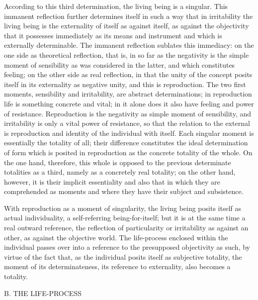 According to this third determination,
the living being is a singular.
This immanent reflection further
 determines itself in such a way
that in irritability the living being is
the externality of itself as against itself,
as against the objectivity
that it possesses immediately
as its means and instrument
and which is externally determinable.
The immanent reflection sublates this immediacy:
on the one side as theoretical reflection,
that is, in so far as the negativity is
the simple moment of sensibility
as was considered in the latter,
and which constitutes feeling;
on the other side as real reflection,
in that the unity of the concept posits itself
in its externality as negative unity,
and this is reproduction.
The two first moments, sensibility and irritability,
are abstract determinations;
in reproduction life is something concrete and vital;
in it alone does it also have feeling and power of resistance.
Reproduction is the negativity as simple moment of sensibility,
and irritability is only a vital power of resistance,
so that the relation to the external is
reproduction and identity of the individual with itself.
Each singular moment is essentially the totality of all;
their difference constitutes the ideal determination of form
which is posited in reproduction as
the concrete totality of the whole.
On the one hand, therefore, this whole is opposed
to the previous determinate totalities as a third,
namely as a concretely real totality;
on the other hand, however, it is their implicit essentiality
and also that in which they are comprehended as moments
and where they have their subject and subsistence.

With reproduction as a moment of singularity,
the living being posits itself as actual individuality,
a self-referring being-for-itself;
but it is at the same time a real outward reference,
the reflection of particularity or irritability
as against an other, as against the objective world.
The life-process enclosed within the individual
passes over into a reference to
the presupposed objectivity as such,
by virtue of the fact that,
as the individual posits itself as subjective totality,
the moment of its determinateness,
its reference to externality,
also becomes a totality.

B. THE LIFE-PROCESS

